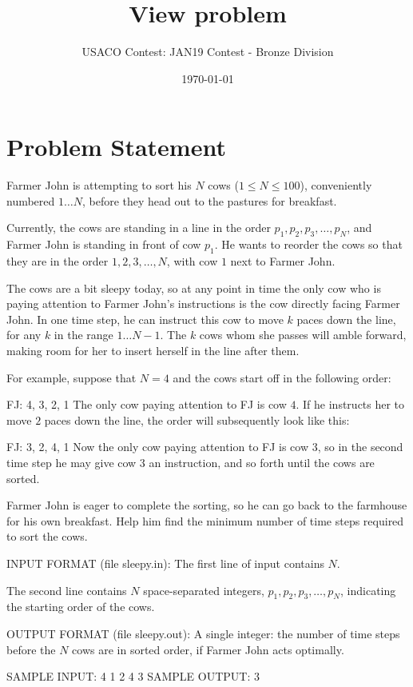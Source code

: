 \documentclass[12pt]{article}
\title{View problem}
\author{USACO Contest: JAN19 Contest - Bronze Division}
\date{\today}
\begin{document}
\maketitle

\section*{Problem Statement}

Farmer John is attempting to sort his $N$ cows ($1 \leq N \leq 100$),
conveniently numbered $1 \dots N$, before they head out to the pastures for
breakfast.

Currently, the cows are standing in a line in the order
$p_1, p_2, p_3,
\dots, p_N$, and Farmer John is standing in front of cow $p_1$.
He wants to reorder the cows so that they are in the order $1, 2, 3, \dots, N$,
with cow $1$ next to Farmer John.

The cows are a bit sleepy today, so at any point in time the only cow who is
paying attention to Farmer John's instructions is the cow directly facing Farmer
John. In one time step, he can instruct this cow to move $k$ paces down the
line, for any $k$ in the range $1 \ldots N-1$. The $k$ cows whom she passes will
amble forward, making room for her to insert herself in the line after them.

For example, suppose that $N=4$ and the cows start off in the following order:

 FJ: 4, 3, 2, 1 
The only cow paying attention to FJ is cow $4$. If he instructs her to move $2$
paces down the line, the order will subsequently look like this:

 FJ: 3, 2, 4, 1 
Now the only cow paying attention to FJ is cow $3$, so in the second time step
he may give cow $3$ an instruction, and so forth until the cows are sorted.

Farmer John is eager to complete the sorting, so he can go back to the farmhouse
for his own breakfast. Help him find the minimum number of time steps required
to sort the cows.

INPUT FORMAT (file sleepy.in):
The first line of input contains $N$.  

The second line contains $N$ space-separated integers, 
$p_1, p_2, p_3, \dots, p_N$, indicating the starting order of the cows.


OUTPUT FORMAT (file sleepy.out):
A single integer: the number of time steps before the $N$ cows are in sorted
order, if Farmer John acts optimally.

SAMPLE INPUT:
4
1 2 4 3
SAMPLE OUTPUT: 
3
\end{document}

